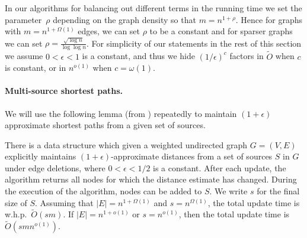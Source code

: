 In our algorithms for balancing out different terms in the running time we set the parameter~$\rho$ depending on the graph density so that $m= n^{1+\rho}$. Hence for graphs with $m= n^{1+\Omega(1)}$ edges, we can set $\rho$ to be a constant and for sparser graphs we can set $\rho = \frac{\sqrt{\log n}}{\log \log n}$. For simplicity of our statements in the rest of this section we assume $0< \epsilon <1$ is a constant, and thus we hide $(1/\epsilon)^c$ factors in $\tilde{O}$ when $c$ is constant, or in $n^{o(1)}$ when $c=\omega(1)$.



\paragraph{Multi-source shortest paths.}
We will use the following lemma (from \cite{LN2020}) repeatedly to maintain $(1+\epsilon)$ approximate shortest paths from a given set of sources. 

\begin{lemma}[\cite{LN2020}]\label{lm:decr_MSSP}
    There is a data structure which given a weighted undirected graph $G = (V, E)$ explicitly maintains $(1+\epsilon)$-approximate distances from a set of sources $S$ in $G$ under edge deletions, where $0<\epsilon< 1/2$ is a constant. After each update, the algorithm returns all nodes for which the distance estimate has changed. 
    During the execution of the algorithm, nodes can be added to $S$. We write $s$ for the final size of $S$. 
    Assuming that $|E| = n^{1+\Omega(1)}$ and $s = n^{\Omega(1)}$, the total update time is w.h.p.~$\tilde O(sm)$. If $|E| = n^{1+o(1)}$ or $s= n^{o(1)}$, then the total update time is $\tilde O(smn^{o(1)})$. 
\end{lemma}

